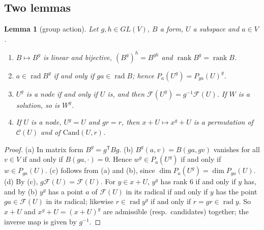 \documentclass[11pt]{article}
\newtheorem{lemma}[theorem]{Lemma}
\theoremstyle{definition}
\DeclareMathOperator{\rad}{rad}
\DeclareMathOperator{\rk}{rank}
\begin{document}
\subsection{Two lemmas}
\begin{lemma}[group action]\label{lem:B-action}
Let $g,h\in GL(V)$, $B$ a form, $U$ a subspace and $a\in V$.
\begin{enumerate}
\item[(a)] $B\mapsto B^g$ is linear and bijective, $(B^g)^h=B^{gh}$ and $\rk B^g=\rk B$.
\item[(b)] $a\in\rad B^g$ if and only if $ga\in\rad B$; hence $P_a(U^g)=P_{ga}(U)^g$.
\item[(c)] $U^g$ is a node if and only if $U$ is, and then $\mathcal F(U^g)=g^{-1}\mathcal F(U)$.
If $W$ is a solution, so is $W^g$.
\item[(d)] If $U$ is a node, $U^g=U$ and $gr=r$, then $x+U\mapsto x^g+U$ is a permutation of
$\mathcal C(U)$ and of $\mathrm{Cand}(U,r)$.
\end{enumerate}
\end{lemma}
\begin{proof}
(a) In matrix form $B^g=g^{\mathsf T}Bg$. (b) $B^g(a,v)=B(ga,gv)$ vanishes for all $v\in V$ if and
only if $B(ga,\cdot)=0$. Hence $w^g\in P_a(U^g)$ if and only if $w\in P_{ga}(U)$. (c) follows from
(a) and (b), since $\dim P_a(U^g)=\dim P_{ga}(U)$. (d) By (c), $g\mathcal F(U)=\mathcal F(U)$.
For $y\in x+U$, $y^g$ has rank $6$ if and only if $y$ has, and by (b) $y^g$ has a point $a$ of
$\mathcal F(U)$ in its radical if and only if $y$ has the point $ga\in\mathcal F(U)$ in its
radical; likewise $r\in\rad y^g$ if and only if $r=gr\in\rad y$. So $x+U$ and $x^g+U=(x+U)^g$
are admissible (resp.\ candidates) together; the inverse map is given by $g^{-1}$.
\end{proof}
\end{document}
